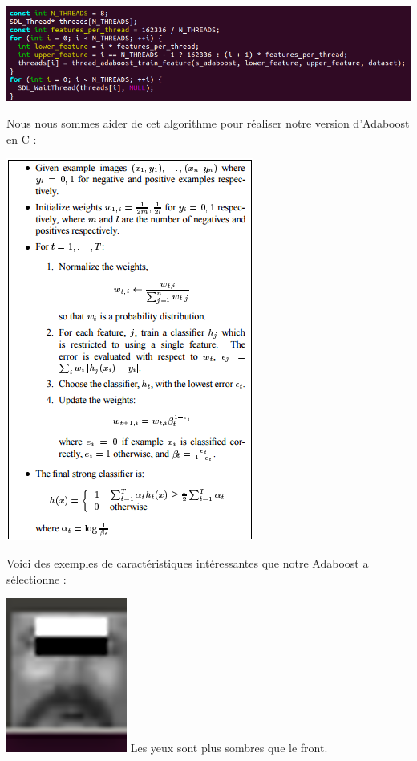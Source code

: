 \documentclass[12pt,a4paper]{article}
\begin{document}
\vspace{0.8cm}
\begin{center}
\includegraphics[scale=.5]{Pictures/threads.png}
\end{center}

\newpage
Nous nous sommes aider de cet algorithme pour réaliser notre version d'Adaboost en C :

\vspace{0.8cm}
\includegraphics[scale=1]{Pictures/adaboost.png}

\newpage
Voici des exemples de caractéristiques intéressantes que notre Adaboost a sélectionne :

\vspace{0.8cm}
\includegraphics[scale=.5]{Pictures/feature5.png}
\newline
Les yeux sont plus sombres que le front.
\end{document}
